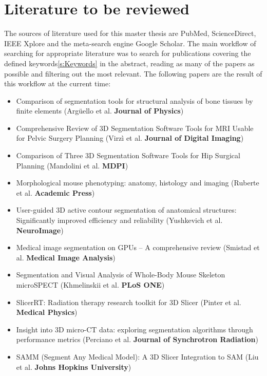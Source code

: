 \section{Literature to be reviewed}
\begin{body}
	The sources of literature used for this master thesis are PubMed, ScienceDirect, IEEE Xplore and the meta-search engine Google Scholar.
	The main workflow of searching for appropriate literature was to search for publications covering the defined keywords\ref{s:Keywords} in the abstract, reading as many of the papers as possible and filtering out the most relevant.
	The following papers are the result of this workflow at the current time:
	\begin{itemize}
		\item Comparison of segmentation tools for structural analysis of bone tissues by finite elements (Argüello et al. \textsf{\textbf{Journal of Physics}})
		\item Comprehensive Review of 3D Segmentation Software Tools for MRI Usable for Pelvic Surgery Planning (Virzì et al. \textsf{\textbf{Journal of Digital Imaging}})
		\item Comparison of Three 3D Segmentation Software Tools for Hip Surgical Planning (Mandolini et al. \textsf{\bfseries{MDPI}})
		\item Morphological mouse phenotyping: anatomy, histology and imaging (Ruberte et al. \textsf{\bfseries{Academic Press}})
		\item User-guided 3D active contour segmentation of anatomical structures: Significantly improved efficiency and reliability (Yushkevich et al. \textsf{\bfseries{NeuroImage}})
		\item Medical image segmentation on GPUs – A comprehensive review (Smistad et al. \textsf{\bfseries{Medical Image Analysis}})
		\item Segmentation and Visual Analysis of Whole-Body Mouse Skeleton microSPECT (Khmelinskii et al. \textsf{\bfseries{PLoS ONE}})
		\item SlicerRT: Radiation therapy research toolkit for 3D Slicer (Pinter et al. \textsf{\bfseries{Medical Physics}})
		\item Insight into 3D micro-CT data: exploring segmentation algorithms through performance metrics (Perciano et al. \textsf{\bfseries{Journal of Synchrotron Radiation}})
		\item SAMM (Segment Any Medical Model): A 3D Slicer Integration to SAM (Liu et al. \textsf{\bfseries{Johns Hopkins University}})
	\end{itemize}
\end{body}

